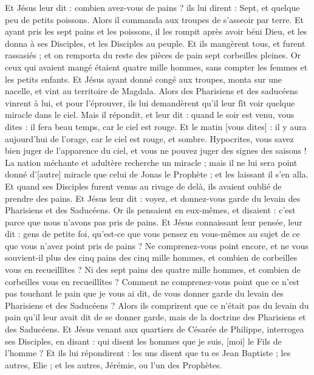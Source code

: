 \begin{multicols}{2}
Et Jésus leur dit : combien avez-vous de pains ? ils lui dirent : Sept, et quelque peu de petits poissons.
Alors il commanda aux troupes de s'asseoir par terre.
Et ayant pris les sept pains et les poissons, il les rompit après avoir béni Dieu, et les donna à ses Disciples, et les Disciples au peuple.
Et ils mangèrent tous, et furent rassasiés ; et on remporta du reste des pièces de pain sept corbeilles pleines.
Or ceux qui avaient mangé étaient quatre mille hommes, sans compter les femmes et les petits enfants.
Et Jésus ayant donné congé aux troupes, monta sur une nacelle, et vint au territoire de Magdala.
\VerseOne{}Alors des Pharisiens et des saducéens vinrent à lui, et pour l'éprouver, ils lui demandèrent qu'il leur fît voir quelque miracle dans le ciel.
Mais il répondit, et leur dit : quand le soir est venu, vous dites : il fera beau temps, car le ciel est rouge.
Et le matin [vous dites] : il y aura aujourd'hui de l'orage, car le ciel est rouge, et sombre. Hypocrites, vous savez bien juger de l'apparence du ciel, et vous ne pouvez juger des signes des saisons !
La nation méchante et adultère recherche un miracle ; mais il ne lui sera point donné d'[autre] miracle que celui de Jonas le Prophète ; et les laissant il s'en alla.
Et quand ses Disciples furent venus au rivage de delà, ils avaient oublié de prendre des pains.
Et Jésus leur dit : voyez, et donnez-vous garde du levain des Pharisiens et des Saducéens.
Or ils pensaient en eux-mêmes, et disaient : c'est parce que nous n'avons pas pris de pains.
Et Jésus connaissant leur pensée, leur dit : gens de petite foi, qu'est-ce que vous pensez en vous-mêmes au sujet de ce que vous n'avez point pris de pains ?
Ne comprenez-vous point encore, et ne vous souvient-il plus des cinq pains des cinq mille hommes, et combien de corbeilles vous en recueillîtes ?
Ni des sept pains des quatre mille hommes, et combien de corbeilles vous en recueillîtes ?
Comment ne comprenez-vous point que ce n'est pas touchant le pain que je vous ai dit, de vous donner garde du levain des Pharisiens et des Saducéens ?
Alors ils comprirent que ce n'était pas du levain du pain qu'il leur avait dit de se donner garde, mais de la doctrine des Pharisiens et des Saducéens.
Et Jésus venant aux quartiers de Césarée de Philippe, interrogea ses Disciples, en disant : qui disent les hommes que je suis, [moi] le Fils de l'homme ?
Et ils lui répondirent : les uns disent que tu es Jean Baptiste ; les autres, Elie ; et les autres, Jérémie, ou l'un des Prophètes.

\end{multicols}
